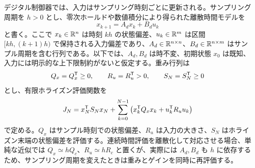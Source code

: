 デジタル制御器では、入力はサンプリング時刻ごとに更新される。サンプリング周期を $h>0$ とし、零次ホールドや数値積分により得られた離散時間モデルを
\begin{equation}
  x_{k+1}=A_d x_k+B_d u_k
  \label{eq:dlqr-system}
\end{equation}
と書く。ここで $x_k\in\mathbb{R}^n$ は時刻 $kh$ の状態偏差、$u_k\in\mathbb{R}^m$ は区間 $[kh,(k+1)h)$ で保持される入力偏差であり、$A_d\in\mathbb{R}^{n\times n}$、$B_d\in\mathbb{R}^{n\times m}$ はサンプル周期を含む行列である。以下では、$A_d,B_d$ は時不変、初期状態 $x_0$ は既知、入力には明示的な上下限制約がないと仮定する。重み行列は
\begin{equation}
  Q_x=Q_x^{\mathsf{T}}\ge0,
  \qquad
  R_u=R_u^{\mathsf{T}}>0,
  \qquad
  S_N=S_N^{\mathsf{T}}\ge0
\end{equation}
とし、有限ホライズン評価関数を
\begin{equation}
  J_N
  =
  x_N^{\mathsf{T}} S_N x_N
  +\sum_{k=0}^{N-1}
  \left(x_k^{\mathsf{T}} Q_x x_k+u_k^{\mathsf{T}} R_u u_k\right)
  \label{eq:dlqr-finite-cost}
\end{equation}
で定める。$Q_x$ はサンプル時刻での状態偏差、$R_u$ は入力の大きさ、$S_N$ はホライズン末端の状態偏差を評価する。連続時間評価を離散化して対応させる場合、単純な近似では $Q_x\simeq hQ_c$、$R_u\simeq hR_c$ と置くが、実際には $A_d,B_d$ も $h$ に依存するため、サンプリング周期を変えたときは重みとゲインを同時に再評価する。

